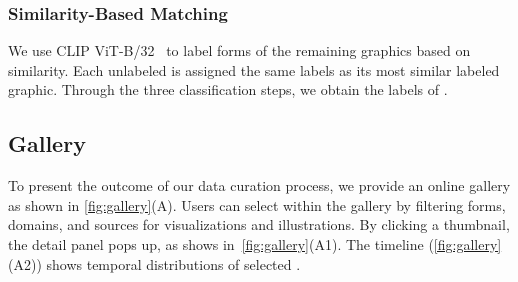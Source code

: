 \subsubsection{Similarity-Based Matching}

We use CLIP ViT-B/32~\cite{Radford2021Learning} to label forms of the remaining graphics based on similarity.
Each unlabeled \itemType is assigned the same labels as its most similar labeled graphic.
Through the three classification steps, we obtain the labels of \numClassified \itemTypePlural.

\subsection{Gallery}
\label{sec:gallery}

To present the outcome of our data curation process, we provide an online gallery as shown in \cref{fig:gallery}(A).
Users can select \itemTypePlural within the gallery by filtering forms, domains, and sources for visualizations and illustrations.
By clicking a \itemType thumbnail, the detail panel pops up, as shows in~\cref{fig:gallery}(A1).
The timeline (\cref{fig:gallery}(A2)) shows temporal distributions of selected \itemTypePlural. 
